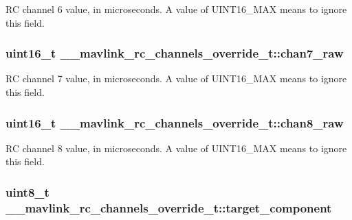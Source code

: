 R\+C channel 6 value, in microseconds. A value of U\+I\+N\+T16\+\_\+\+M\+A\+X means to ignore this field. 

\hypertarget{struct____mavlink__rc__channels__override__t_a0380add4a72cd924a6ac61d1504dad82}{
\subsubsection[{chan7\+\_\+raw}]{\setlength{\rightskip}{0pt plus 5cm}uint16\+\_\+t \+\_\+\+\_\+mavlink\+\_\+rc\+\_\+channels\+\_\+override\+\_\+t\+::chan7\+\_\+raw}}\label{struct____mavlink__rc__channels__override__t_a0380add4a72cd924a6ac61d1504dad82}


R\+C channel 7 value, in microseconds. A value of U\+I\+N\+T16\+\_\+\+M\+A\+X means to ignore this field. 

\hypertarget{struct____mavlink__rc__channels__override__t_a8028c42950c16d10f196f35df6d32404}{
\subsubsection[{chan8\+\_\+raw}]{\setlength{\rightskip}{0pt plus 5cm}uint16\+\_\+t \+\_\+\+\_\+mavlink\+\_\+rc\+\_\+channels\+\_\+override\+\_\+t\+::chan8\+\_\+raw}}\label{struct____mavlink__rc__channels__override__t_a8028c42950c16d10f196f35df6d32404}


R\+C channel 8 value, in microseconds. A value of U\+I\+N\+T16\+\_\+\+M\+A\+X means to ignore this field. 

\hypertarget{struct____mavlink__rc__channels__override__t_af53aa3ccd48e674dd69ad102616b4045}{
\subsubsection[{target\+\_\+component}]{\setlength{\rightskip}{0pt plus 5cm}uint8\+\_\+t \+\_\+\+\_\+mavlink\+\_\+rc\+\_\+channels\+\_\+override\+\_\+t\+::target\+\_\+component}}\label{struct____mavlink__rc__channels__override__t_af53aa3ccd48e674dd69ad102616b4045}


